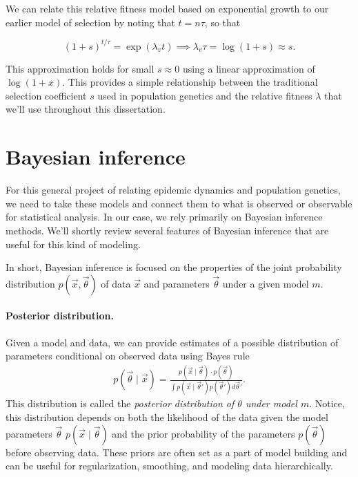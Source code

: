 We can relate this relative fitness model based on exponential growth to our earlier model of selection by noting that $t = n\tau$, so that

\begin{equation}
(1 + s)^{t / \tau} = \exp(\lambda_v t) \implies \lambda_v \tau = \log{(1 + s)} \approx s.
\end{equation}

This approximation holds for small $s \approx 0$ using a linear approximation of $\log(1+x)$.
This provides a simple relationship between the traditional selection coefficient $s$ used in population genetics and the relative fitness $\lambda$ that we'll use throughout this dissertation.

\section{Bayesian inference}%

For this general project of relating epidemic dynamics and population genetics, we need to take these models and connect them to what is observed or observable for statistical analysis.
In our case, we rely primarily on Bayesian inference methods.
We'll shortly review several features of Bayesian inference that are useful for this kind of modeling.

In short, Bayesian inference is focused on the properties of the joint probability distribution  $p(\vec{x}, \vec{\theta})$ of data $\vec{x}$ and parameters $\vec{\theta}$ under a given model $m$.

\paragraph{Posterior distribution.}
Given a model and data, we can provide estimates of a possible distribution of parameters conditional on observed data using Bayes rule
\begin{align}
p(\vec{\theta} \mid \vec{x}) = \frac{p(\vec{x} \mid \vec{\theta})\cdot p(\vec{\theta})}{\int p(\vec{x} \mid \vec{\theta}') p(\vec{\theta}') d \vec{\theta}'}.
\end{align}
This distribution is called the \emph{posterior distribution of $\theta$ under model $m$}.
Notice, this distribution depends on both the likelihood of the data given the model parameters $\vec{\theta}$ $p(\vec{x} \mid \vec{\theta})$ and the prior probability of the parameters $p(\vec{\theta})$ before observing data.
These priors are often set as a part of model building and can be useful for regularization, smoothing, and modeling data hierarchically.

